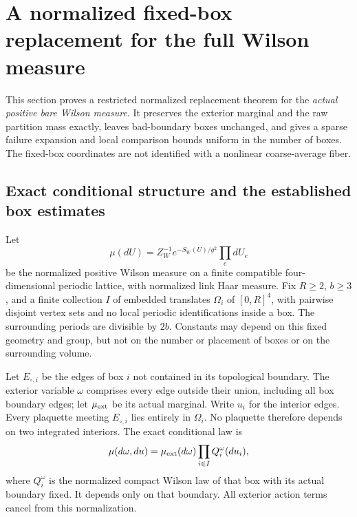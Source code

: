 \section{A normalized fixed-box replacement for the full Wilson measure}
\label{nbr-section}

This section proves a restricted normalized replacement theorem for the
\emph{actual positive bare Wilson measure}. It preserves the exterior
marginal and the raw partition mass exactly, leaves bad-boundary boxes
unchanged, and gives a sparse failure expansion and local comparison
bounds uniform in the number of boxes. The fixed-box coordinates are
not identified with a nonlinear coarse-average fiber.

\subsection{Exact conditional structure and the established box estimates}
\label{nbr-input-section}

Let
\[
 \mu(dU)=Z_W^{-1}e^{-S_W(U)/g^2}\prod_e dU_e
\]
be the normalized positive Wilson measure on a finite compatible
four-dimensional periodic lattice, with normalized link Haar measure.
Fix \(R\ge2\), \(b\ge3\), and a finite collection \(I\) of embedded
translates \(\Omega_i\) of \([0,R]^4\), with pairwise disjoint vertex
sets and no local periodic identifications inside a box. The surrounding
periods are divisible by \(2b\). Constants may depend on this fixed
geometry and group, but not on the number or placement of boxes or on
the surrounding volume.

Let \(E_{\circ,i}\) be the edges of box \(i\) not contained in its
topological boundary. The exterior variable \(\omega\) comprises every
edge outside their union, including all box boundary edges; let
\(\mu_{\rm ext}\) be its actual marginal. Write \(u_i\) for the
interior edges. Every plaquette meeting \(E_{\circ,i}\) lies entirely
in \(\Omega_i\). No plaquette therefore depends on two integrated
interiors. The exact conditional law is
\begin{equation}
 \mu(d\omega,du)=\mu_{\rm ext}(d\omega)
                    \prod_{i\in I}Q_i^\omega(du_i),
 \label{nbr-disintegration}
\end{equation}
where \(Q_i^\omega\) is the normalized compact Wilson law of that box
with its actual boundary fixed. It depends only on that boundary.
All exterior action terms cancel from this normalization.

